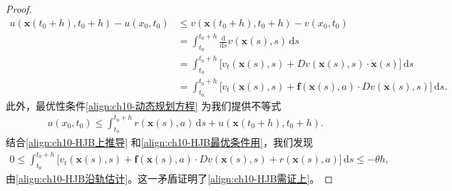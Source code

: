\documentclass[../../main.tex]{subfiles}
\begin{document}
\begin{proof}
\begin{align}
u(\mathbf{x}(t_0+h),t_0+h)-u(x_0,t_0) &\leqslant v(\mathbf{x}(t_0+h),t_0+h)-v(x_0,t_0)\nonumber\\
&=\int_{t_0}^{t_0+h}\frac{\mathrm{d}}{\mathrm{d}s}v(\mathbf{x}(s),s)\,\mathrm{d}s\nonumber\\
&=\int_{t_0}^{t_0+h}\big[v_t(\mathbf{x}(s),s)+Dv(\mathbf{x}(s),s)\cdot\dot{\mathbf{x}}(s)\big]\,\mathrm{d}s\nonumber\\
&=\int_{t_0}^{t_0+h}\big[v_t(\mathbf{x}(s),s)+\mathbf{f}(\mathbf{x}(s),a)\cdot Dv(\mathbf{x}(s),s)\big]\,\mathrm{d}s.
\label{align:ch10-HJB上推导}
\end{align}
此外，最优性条件\eqref{align:ch10-动态规划方程} 为我们提供不等式
\begin{align}
u(x_0,t_0)\leqslant \int_{t_0}^{t_0+h}r(\mathbf{x}(s),a)\,\mathrm{d}s+u(\mathbf{x}(t_0+h),t_0+h).
\label{align:ch10-HJB最优条件用}
\end{align}
结合\eqref{align:ch10-HJB上推导} 和\eqref{align:ch10-HJB最优条件用}，我们发现
\begin{align*}
0\leqslant \int_{t_0}^{t_0+h}\big[v_t(\mathbf{x}(s),s)+\mathbf{f}(\mathbf{x}(s),a)\cdot Dv(\mathbf{x}(s),s)+r(\mathbf{x}(s),a)\big]\,\mathrm{d}s\leqslant-\theta h,
\end{align*}
由\eqref{align:ch10-HJB沿轨估计}。这一矛盾证明了\eqref{align:ch10-HJB需证上}。


\end{proof}
\end{document}
